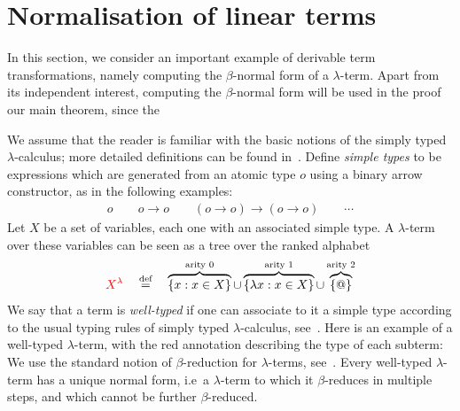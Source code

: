 \section{Normalisation of linear terms}
\label{sec:one-register}

In this section, we consider an important example of derivable term transformations, namely computing the $\beta$-normal form of a  $\lambda$-term. Apart from its independent interest, computing the $\beta$-normal form will be used in the proof our main theorem, since the 



\newcommand{\otype}{o}
We assume that the reader is familiar with the basic notions of the simply typed $\lambda$-calculus; more detailed definitions can be found in~\cite{sorensen_lectures_2006}. 
Define  \emph{simple types} to be expressions which are generated from an atomic type $\otype$ using a binary arrow constructor, as in the following examples:
    \begin{align*}
        \otype \qquad \otype \to \otype \qquad (\otype \to \otype) \to (\otype \to \otype) \qquad \cdots 
    \end{align*}
Let $X$ be a set of variables, each one with an associated simple type. A $\lambda$-term over these variables can be seen as a tree over the ranked alphabet
\begin{align*}
    {\color{red}{X^\lambda}} \quad \stackrel{\text{def}}= \quad  \overbrace{\{x : x \in X\}}^{\text{arity 0}} \cup \overbrace{\{\lambda x : x \in X\}}^{\text{arity 1}} \cup  \overbrace{\{@\}}^{\text{arity 2}}
\end{align*}
We say that a term is \emph{well-typed} if one can associate  to it  a simple type according to the usual typing rules of simply typed $\lambda$-calculus, see~\cite[Definition 3.2.1]{sorensen_lectures_2006}. Here is an example of a well-typed $\lambda$-term, with the red annotation describing the type of each subterm:
We use the standard notion of $\beta$-reduction for $\lambda$-terms, see~\cite[Definition 1.2.1]{sorensen_lectures_2006}. 
Every well-typed $\lambda$-term has a unique normal form, i.e~a $\lambda$-term to which it $\beta$-reduces in multiple steps, and which cannot be further $\beta$-reduced.


